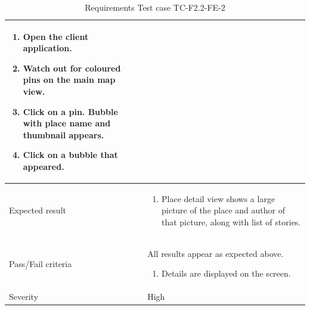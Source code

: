 \documentclass[11pt]{book}
\begin{document}
\begin{table}
\begin{tabular}{| p{3cm} | p{9.5cm} |}
                            \begin{enumerate}
                              \item Open the client application.
                              \item Watch out for coloured pins on the main map view.
                              \item Click on a pin. Bubble with place name and thumbnail appears.
                              \item Click on a bubble that appeared.
                            \end{enumerate} \\ \hline 
    Expected result       & \begin{enumerate}
                              \item Place detail view shows a large picture of the place and author of that picture, along with list of stories.
                            \end{enumerate} \\ \hline 
    Pass/Fail criteria    & All results appear as expected above.
                            \begin{enumerate}
                              \item Details are displayed on the screen.
                            \end{enumerate} \\ \hline 
    Severity              & High \\ \hline 
  \end{tabular}
  \caption{Requirements Test case TC-F2.2-FE-2}
  \label{tab:TCF2.2FE2}
\end{table}
\end{document}
